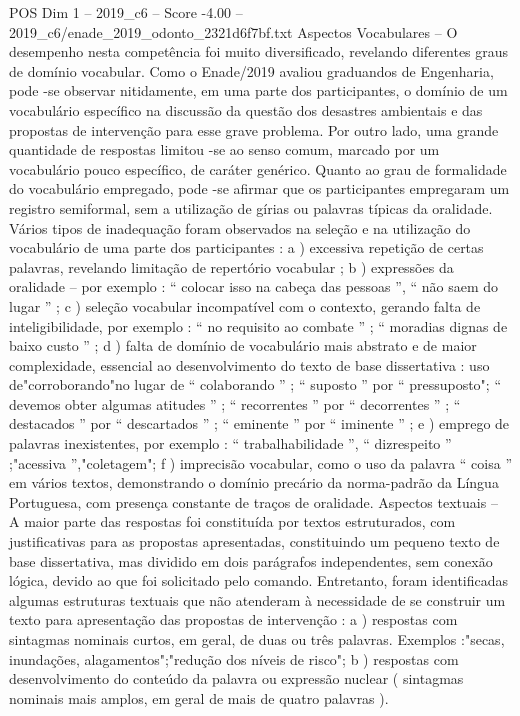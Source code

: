 \begin{textsample}{POS Dim 1 – 2019\_c6 – Score -4.00 – 2019\_c6/enade\_2019\_odonto\_2321d6f7bf.txt}
Aspectos Vocabulares – O desempenho nesta competência foi muito diversificado, revelando diferentes graus de domínio vocabular.
Como o Enade/2019 avaliou graduandos de Engenharia, pode -se observar nitidamente, em uma parte dos participantes, o domínio de um vocabulário específico na discussão da questão dos desastres ambientais e das propostas de intervenção para esse grave problema.
Por outro lado, uma grande quantidade de respostas limitou -se ao senso comum, marcado por um vocabulário pouco específico, de caráter genérico.
Quanto ao grau de formalidade do vocabulário empregado, pode -se afirmar que os participantes empregaram um registro semiformal, sem a utilização de gírias ou palavras típicas da oralidade.
Vários tipos de inadequação foram observados na seleção e na utilização do vocabulário de uma parte dos participantes : a ) excessiva repetição de certas palavras, revelando limitação de repertório vocabular ; b ) expressões da oralidade – por exemplo : “ colocar isso na cabeça das pessoas ”, “ não saem do lugar ” ; c ) seleção vocabular incompatível com o contexto, gerando falta de inteligibilidade, por exemplo : “ no requisito ao combate ” ; “ moradias dignas de baixo custo ” ; d ) falta de domínio de vocabulário mais abstrato e de maior complexidade, essencial ao desenvolvimento do texto de base dissertativa : uso de"corroborando"no lugar de “ colaborando ” ; “ suposto ” por “ pressuposto"; “ devemos obter algumas atitudes ” ; “ recorrentes ” por “ decorrentes ” ; “ destacados ” por “ descartados ” ; “ eminente ” por “ iminente ” ; e ) emprego de palavras inexistentes, por exemplo : “ trabalhabilidade ”, “ dizrespeito ” ;"acessiva ”,"coletagem"; f ) imprecisão vocabular, como o uso da palavra “ coisa ” em vários textos, demonstrando o domínio precário da norma-padrão da Língua Portuguesa, com presença constante de traços de oralidade.
Aspectos textuais – A maior parte das respostas foi constituída por textos estruturados, com justificativas para as propostas apresentadas, constituindo um pequeno texto de base dissertativa, mas dividido em dois parágrafos independentes, sem conexão lógica, devido ao que foi solicitado pelo comando.
Entretanto, foram identificadas algumas estruturas textuais que não atenderam à necessidade de se construir um texto para apresentação das propostas de intervenção : a ) respostas com sintagmas nominais curtos, em geral, de duas ou três palavras.
Exemplos :"secas, inundações, alagamentos";"redução dos níveis de risco"; b ) respostas com desenvolvimento do conteúdo da palavra ou expressão nuclear ( sintagmas nominais mais amplos, em geral de mais de quatro palavras ).

\end{textsample}
